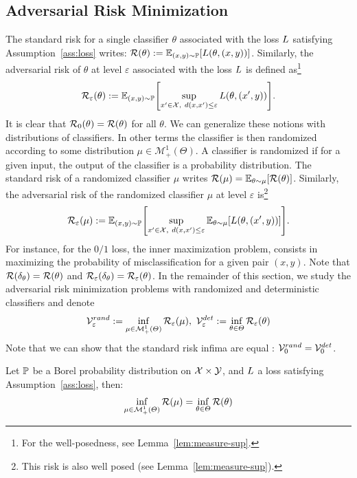 \subsection{Adversarial Risk Minimization}
The standard risk for a single classifier $\theta$ associated with the loss $L$ satisfying Assumption~\ref{ass:loss} writes: $\risk(\theta):=\mathbb{E}_{(x,y)\sim \PP}\left[\loss(\theta,(x,y))\right]$. Similarly, the adversarial risk of $\theta$ at level $\varepsilon$ associated with the loss $L$ is defined as\footnote{For the well-posedness, see Lemma~\ref{lem:measure-sup}.}
\begin{align*}
    \risk_\varepsilon(\theta):=\mathbb{E}_{(x,y)\sim \PP}\left[\sup_{x'\in\XX,~d(x,x')\leq\varepsilon}\loss(\theta,(x',y))\right].
\end{align*}
 It is clear that $\mathcal{R}_0(\theta) =\mathcal{R}(\theta)$ for all $\theta$. We can generalize these notions with distributions of classifiers. In other terms the classifier is then randomized according to some distribution $\mu\in\mathcal{M}^1_+(\Theta)$. A classifier is randomized if for a given input, the output of the classifier is a probability distribution.
 The standard risk of a randomized classifier $\mu$ writes $\risk(\mu) = \mathbb{E}_{\theta\sim\mu}\left[\risk (\theta)\right]$. Similarly, the adversarial risk of the randomized classifier $\mu$ at level $\varepsilon$ is\footnote{This risk is also well posed (see Lemma~\ref{lem:measure-sup}).}
\begin{align*}
    \risk_\varepsilon(\mu):=\mathbb{E}_{(x,y)\sim \PP}\left[\sup_{x'\in\XX,~d(x,x')\leq\varepsilon}\mathbb{E}_{\theta\sim\mu}\left[\loss(\theta,(x',y))\right]\right].
\end{align*}
For instance, for the $0/1$ loss, the inner maximization problem, consists in maximizing the probability of misclassification for a given pair $(x,y)$. Note that $\mathcal{R}(\delta_\theta)=\mathcal{R}(\theta)$ and $\mathcal{R}_\varepsilon(\delta_\theta)=\mathcal{R}_\varepsilon(\theta)$. In the remainder of this section, we study the adversarial risk minimization problems with randomized and deterministic classifiers and denote
\begin{align}
\label{eq:advriskmin}
    \mathcal{V}^{rand}_\varepsilon:=\inf_{\mu\in\mathcal{M}^1_+(\Theta)} \mathcal{R}_\varepsilon(\mu),~\mathcal{V}^{det}_\varepsilon:=\inf_{\theta\in\Theta} \mathcal{R}_\varepsilon(\theta)
\end{align}
Note that we can show that the standard risk infima are equal :  $\mathcal{V}^{rand}_0=\mathcal{V}^{det}_0$. 
\begin{prop}
\label{prop:eqstandardrisk}
Let $\mathbb{P}$ be a Borel probability distribution on $\mathcal{X}\times\mathcal{Y}$, and $L$ a loss satisfying Assumption~\ref{ass:loss}, then:
\begin{align*}
        \inf_{\mu\in\mathcal{M}^1_+(\Theta)} \mathcal{R}(\mu) =\inf_{\theta\in\Theta} \mathcal{R}(\theta)
\end{align*}
\end{prop}
